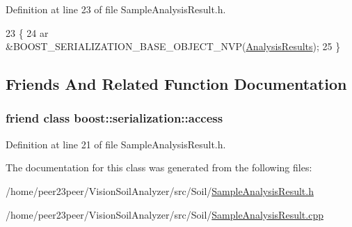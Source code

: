 Definition at line 23 of file Sample\+Analysis\+Result.\+h.


\begin{DoxyCode}
23                                                           \{
24     ar &BOOST\_SERIALIZATION\_BASE\_OBJECT\_NVP(\hyperlink{class_soil_analyzer_1_1_analysis_results_a893864c1e4bf50bf6979088a390da482}{AnalysisResults});
25   \}
\end{DoxyCode}


\subsection{Friends And Related Function Documentation}
\hypertarget{class_soil_analyzer_1_1_sample_analysis_result_ac98d07dd8f7b70e16ccb9a01abf56b9c}{}
\subsubsection[{boost\+::serialization\+::access}]{\setlength{\rightskip}{0pt plus 5cm}friend class boost\+::serialization\+::access\hspace{0.3cm}{\ttfamily [friend]}}\label{class_soil_analyzer_1_1_sample_analysis_result_ac98d07dd8f7b70e16ccb9a01abf56b9c}


Definition at line 21 of file Sample\+Analysis\+Result.\+h.



The documentation for this class was generated from the following files\+:\begin{DoxyCompactItemize}
\item 
/home/peer23peer/\+Vision\+Soil\+Analyzer/src/\+Soil/\hyperlink{_sample_analysis_result_8h}{Sample\+Analysis\+Result.\+h}\item 
/home/peer23peer/\+Vision\+Soil\+Analyzer/src/\+Soil/\hyperlink{_sample_analysis_result_8cpp}{Sample\+Analysis\+Result.\+cpp}\end{DoxyCompactItemize}
